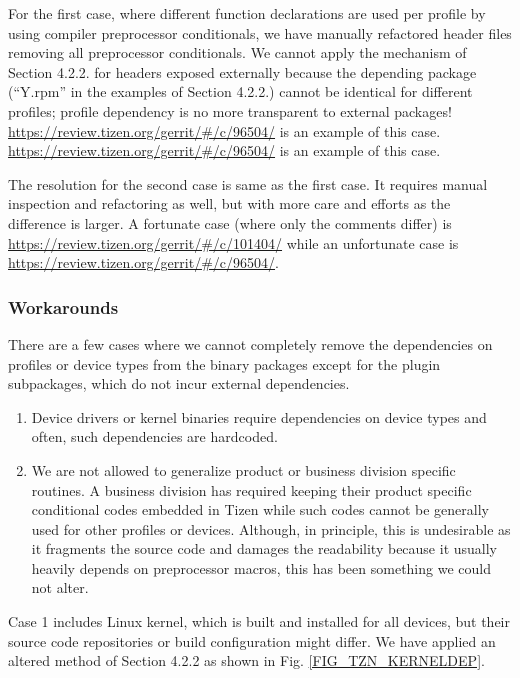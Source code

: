 For the first case, where different function declarations are used per profile by using compiler preprocessor conditionals, we have manually refactored header files removing all preprocessor conditionals. We cannot apply the mechanism of Section 4.2.2. for headers exposed externally because the depending package (“Y.rpm” in the examples of Section 4.2.2.) cannot be identical for different profiles; profile dependency is no more transparent to external packages! \url{https://review.tizen.org/gerrit/#/c/96504/} is an example of this case. \url{https://review.tizen.org/gerrit/#/c/96504/} is an example of this case. 


The resolution for the second case is same as the first case. It requires manual inspection and refactoring as well, but with more care and efforts as the difference is larger. A fortunate case (where only the comments differ) is \url{https://review.tizen.org/gerrit/#/c/101404/} while an unfortunate case is \url{https://review.tizen.org/gerrit/#/c/96504/}.


\subsubsection{Workarounds}

There are a few cases where we cannot completely remove the dependencies on profiles or device types from the binary packages except for the plugin subpackages, which do not incur external dependencies.

\begin{enumerate}
\item Device drivers or kernel binaries require dependencies on device types and often, such dependencies are hardcoded.
\item We are not allowed to generalize product or business division specific routines. A business division has required keeping their product specific conditional codes embedded in Tizen while such codes cannot be generally used for other profiles or devices. Although, in principle, this is undesirable as it fragments the source code and damages the readability because it usually heavily depends on preprocessor macros, this has been something we could not alter.
\end{enumerate}
Case 1 includes Linux kernel, which is built and installed for all devices, but their source code repositories or build configuration might differ. We have applied an altered method of Section 4.2.2 as shown in Fig. \ref{FIG_TZN_KERNELDEP}.


